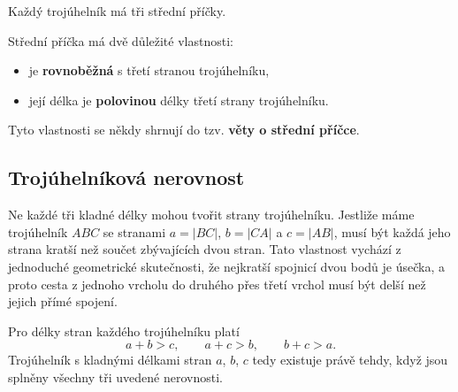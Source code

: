\documentclass[12pt,a4paper]{article}
\begin{document}
Každý trojúhelník má tři střední příčky.

\begin{center}
\end{center}

Střední příčka má dvě důležité vlastnosti:
\begin{itemize}
    \item je \textbf{rovnoběžná} s třetí stranou trojúhelníku,
    \item její délka je \textbf{polovinou} délky třetí strany trojúhelníku.
\end{itemize}

Tyto vlastnosti se někdy shrnují do tzv. \textbf{věty o střední příčce}.


\subsection{Trojúhelníková nerovnost}

Ne každé tři kladné délky mohou tvořit strany trojúhelníku. Jestliže máme trojúhelník $ABC$ se stranami
$a=|BC|$, $b=|CA|$ a $c=|AB|$, musí být každá jeho strana kratší než součet zbývajících dvou stran. Tato
vlastnost vychází z jednoduché geometrické skutečnosti, že nejkratší spojnicí dvou bodů je úsečka, a proto
cesta z jednoho vrcholu do druhého přes třetí vrchol musí být delší než jejich přímé spojení.

\begin{definitionbox}
    Pro délky stran každého trojúhelníku platí 
    \[
        a+b>c, \qquad a+c>b, \qquad b+c>a.
    \]
    Trojúhelník s kladnými délkami stran $a$, $b$, $c$ tedy existuje právě tehdy, když jsou splněny všechny tři uvedené nerovnosti.
\end{definitionbox}
\end{document}

